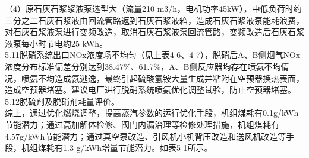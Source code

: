 \documentclass[a4paper, 11pt]{article}
\begin{document}
\indent
（4）原石灰石浆浆液泵选型大（流量210 m3/h，电机功率45kW），中低负荷时约三分之二石灰石浆液由回流管路返到石灰石浆液箱，造成石灰石浆液泵能耗浪费，对石灰石浆液泵进行变频改造，取消石灰石浆液泵回流管路，变频改造后石灰石浆液泵每小时节电约25 kWh。\\
\indent
5.11脱硝系统出口NOx浓度场不均匀（见上表4-6、4-7），脱硝后A、B侧烟气NOx浓度分布标准偏差分别达到38.47\%、61.7\%，A、B侧反应器均存在喷氨不均情况，喷氨不均造成氨逃逸，最终引起硫酸氢铵大量生成并粘附在空预器换热表面，造成空预器堵塞。建议电厂进行脱硝系统喷氨优化调整试验，防止空预器堵塞。\\
\indent
5.12脱硫剂及脱硝剂耗量评价。\\
\indent
综上，通过优化燃烧调整，提高蒸汽参数的运行优化手段，机组煤耗有0.1g/kWh节能潜力；通过高加解体检修、阀门内漏治理等检修处理措施，机组煤耗有4.57g/kWh节能潜力；通过真空泵改造、引风机小机背压改造和送风机改造等手段，机组煤耗有1.3 g/kWh增量节能潜力。如表5-1所示。\\
\end{document}
